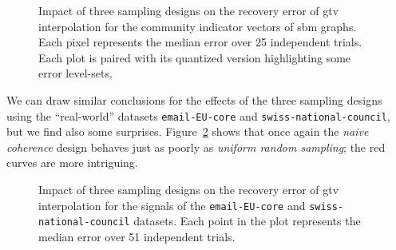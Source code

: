 \clearpage
\begin{figure}
    \centering
    \hfill
    \caption[Three sampling designs: \texttt{2-SSBM}(500~+~500) and \texttt{2-SBM}(200~+~800)]{Impact of three sampling designs on the recovery error of \acrshort{gtv} interpolation for the community indicator vectors of \acrshort{sbm} graphs. Each pixel represents the median error over 25 independent trials. Each plot is paired with its quantized version highlighting some error level-sets.}
    \label{fig:pt_2sbm_tv_interp}
\end{figure}
\clearpage

We can draw similar conclusions for the effects of the three sampling designs using the ``real-world'' datasets \texttt{email-EU-core} and \texttt{swiss-national-council}, but we find also some surprises. Figure~\ref{fig:pt_email_snc_tv_interp} shows that once again the \emph{naive coherence} design behaves just as poorly as \emph{uniform random sampling}; the red curves are more intriguing.

\begin{figure}[H]
    \centering
    \hfill
    \caption[Three sampling designs: \texttt{email-EU-core} and \texttt{swiss-national-council}]{Impact of three sampling designs on the recovery error of \acrshort{gtv} interpolation for the signals of the \texttt{email-EU-core} and \texttt{swiss-national-council} datasets. Each point in the plot represents the median error over 51 independent trials.}
    \label{fig:pt_email_snc_tv_interp}
\end{figure}
\clearpage

